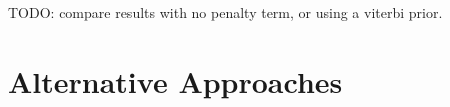 %
%
%
%
\begin{comment}

\newcommand{\Res}[4]{
  \includegraphics[width=0.15\textwidth]
                  {full_results/#1/#2_#3_frame#4_dp.png}}
\newcommand{\TopRes}[3]{\Res{top}{#1}{#2}{#3}}
\newcommand{\MedRes}[3]{\Res{median}{#1}{#2}{#3}}
\newcommand{\FailRes}[3]{\Res{fail}{#1}{#2}{#3}}

\begin{figure*}[tb]%
  \centering
  \begin{tabular}{ccc}
    \textbf{Results above 90th percentile} &
    \textbf{Results near median} &
    \textbf{Failures (below 10th percentile)} \\

    \TopRes{lab}{foyer2}{046}
    \TopRes{lab}{foyer1}{005} &

    \MedRes{exeter}{bursary}{008}
    \MedRes{exeter}{mcr1}{015} &

    \FailRes{exeter}{bursary}{021}
    \FailRes{exeter}{mcr1}{029} \\

    \TopRes{exeter}{mcr1}{024}
    \TopRes{lab}{foyer2}{001} &

    \MedRes{exeter}{mcr1}{021}
    \MedRes{exeter}{mcr1}{042} &

    \FailRes{exeter}{mcr1}{039}
    \FailRes{lab}{kitchen1}{017} \\

    \TopRes{lab}{foyer2}{035}
    \TopRes{som}{corr1}{013} &

    \MedRes{lab}{kitchen1}{091}
    \MedRes{exeter}{mcr1}{049} &

    \FailRes{lab}{kitchen1}{089}
    \FailRes{som}{corr1}{006} \\
  \end{tabular}
  \caption{Scenes output from our system. The left column shows
  results above the 90th percentile of performance (relative depth
  error), the middle column shows results near median performance, and
  the right column shows failure cases.}
  \label{fig:results-pics}
\end{figure*}
\end{comment}

TODO: compare results with no penalty term, or using a viterbi prior.

\section{Alternative Approaches}

